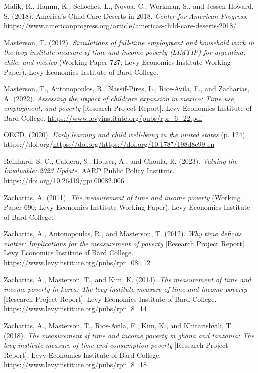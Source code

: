 \documentclass[
  11pt,
]{article}
\newlength{\cslhangindent}
\newenvironment{CSLReferences}[2] %
 {\begin{list}{}{%
  \setlength{\itemindent}{0pt}
  \setlength{\leftmargin}{0pt}
  \setlength{\parsep}{0pt}
  \ifodd #1
   \setlength{\leftmargin}{\cslhangindent}
   \setlength{\itemindent}{-1\cslhangindent}
  \fi
  \setlength{\itemsep}{#2\baselineskip}}}
 {\end{list}}
\begin{document}
\begin{CSLReferences}{1}{0}
Malik, R., Hamm, K., Schochet, L., Novoa, C., Workman, S., and
Jessen-Howard, S. (2018). America's {Child} {Care} {Deserts} in 2018.
\emph{Center for American Progress}.
\url{https://www.americanprogress.org/article/americas-child-care-deserts-2018/}

Masterson, T. (2012). \emph{Simulations of full-time employment and
household work in the levy institute measure of time and income poverty
(LIMTIP) for argentina, chile, and mexico} (Working Paper 727; Levy
Economics Institute Working Paper). Levy Economics Institute of Bard
College.

Masterson, T., Antonopoulos, R., Nassif-Pires, L., Rios-Avila, F., and
Zacharias, A. (2022). \emph{Assessing the impact of childcare expansion
in mexico: Time use, employment, and poverty} {[}Research Project
Report{]}. Levy Economics Institute of Bard College.
\url{https://www.levyinstitute.org/pubs/rpr_6_22.pdf}

OECD. (2020). \emph{Early learning and child well-being in the united
states} (p. 124).
https://doi.org/\url{https://doi.org/https://doi.org/10.1787/198d8c99-en}

Reinhard, S. C., Caldera, S., Houser, A., and Choula, R. (2023).
\emph{Valuing the {Invaluable}: 2023 {Update}}. AARP Public Policy
Institute. \url{https://doi.org/10.26419/ppi.00082.006}

Zacharias, A. (2011). \emph{The measurement of time and income poverty}
(Working Paper 690; Levy Economics Institute Working Paper). Levy
Economics Institute of Bard College.

Zacharias, A., Antonopoulos, R., and Masterson, T. (2012). \emph{Why
time deficits matter: Implications for the measurement of poverty}
{[}Research Project Report{]}. Levy Economics Institute of Bard College.
\url{https://www.levyinstitute.org/pubs/rpr_08_12}

Zacharias, A., Masterson, T., and Kim, K. (2014). \emph{The measurement
of time and income poverty in korea: The levy institute measure of time
and income poverty} {[}Research Project Report{]}. Levy Economics
Institute of Bard College.
\url{https://www.levyinstitute.org/pubs/rpr_8_14}

Zacharias, A., Masterson, T., Rios-Avila, F., Kim, K., and
Khitarishvili, T. (2018). \emph{The measurement of time and income
poverty in ghana and tanzania: The levy institute measure of time and
consumption poverty} {[}Research Project Report{]}. Levy Economics
Institute of Bard College.
\url{https://www.levyinstitute.org/pubs/rpr_8_18}


\end{CSLReferences}
\end{document}
